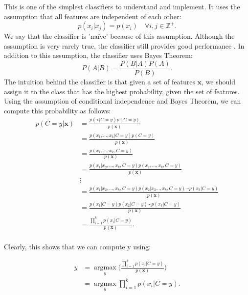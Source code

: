 \documentclass[12pt,a4paper,twoside,openright]{report}
\begin{document}
This is one of the simplest classifiers to understand and implement. It uses the assumption that all features are independent of each other:
\begin{equation}
	p(x_i | x_j) = p(x_i) \quad \forall i, j \in \mathbb{Z}^+.
\end{equation}
We say that the classifier is 'na\"{i}ve' because of this assumption. Although the assumption is very rarely true, the classifier still provides good performance \cite{ml_book_murphy}.
\newline
\newline
In addition to this assumption, the classifier uses Bayes Theorem:
\begin{equation}
	P(A | B) = \frac{P(B | A)P(A)}{P(B)}.
\end{equation}
The intuition behind the classifier is that given a set of features $\mathbf{x}$, we should assign it to the class that has the highest probability, given the set of features. Using the assumption of conditional independence and Bayes Theorem, we can compute this probability as follows:
\begin{equation}
\begin{aligned}
p(C = y | \mathbf{x}) &= \frac{p(\mathbf{x} | C = y)p(C = y)}{p(\mathbf{x})} \\
&= \frac{p(x_1, \ldots, x_k | C = y)p(C = y)}{p(\mathbf{x})} \\
&= \frac{p(x_1, \ldots, x_k, C = y)}{p(\mathbf{x})} \\
&= \frac{p(x_1 | x_2, \ldots, x_k, C = y)p(x_2, \ldots, x_k, C = y)}{p(\mathbf{x})} \\
& \vdots \\
&= \frac{p(x_1 | x_2, \ldots, x_k, C = y)p(x_2 | x_3 \ldots, x_k, C = y)\cdots p(x_k | C = y)}{p(\mathbf{x})} \\
&= \frac{p(x_1 | C = y)p(x_2 | C = y) \cdots p(x_k | C = y)}{p(\mathbf{x})} \\
&= \frac{\prod_{i = 1}^{k}p(x_i | C = y)}{p(\mathbf{x})}. \\
\end{aligned}
\end{equation}

Clearly, this shows that we can compute y using:

\begin{equation}
\begin{aligned}
y &= \underset{y}{\operatorname{argmax}}\bigg(\frac{\prod_{i = 1}^{k}p(x_i | C = y)}{p(\mathbf{x})}\bigg) \\
&= \underset{y}{\operatorname{argmax}} \displaystyle \prod_{i = 1}^{k}p(x_i | C = y). \\
\end{aligned}
\end{equation}
\end{document}
